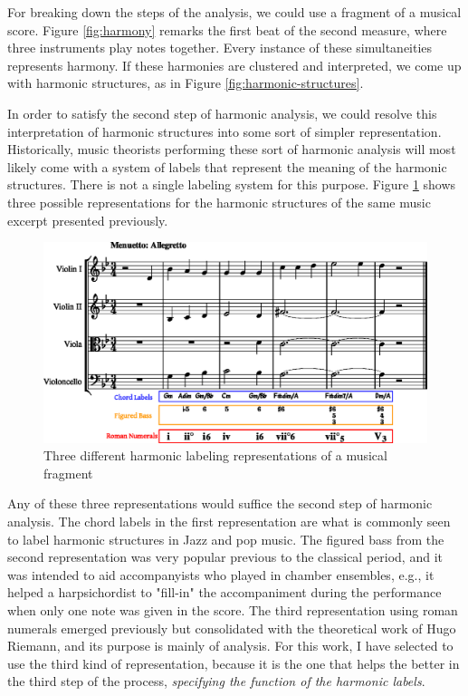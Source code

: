 For breaking down the steps of the analysis, we could use a fragment of a musical score. Figure \ref{fig:harmony} remarks the first beat of the second measure, where three instruments play notes together. Every instance of these simultaneities represents harmony. If these harmonies are clustered and interpreted, we come up with harmonic structures, as in Figure \ref{fig:harmonic-structures}.

In order to satisfy the second step of harmonic analysis, we could resolve this interpretation of harmonic structures into some sort of simpler representation. Historically, music theorists performing these sort of harmonic analysis will most likely come with a system of labels that represent the meaning of the harmonic structures. There is not a single labeling system for this purpose. Figure \ref{fig:harmonic-labels} shows three possible representations for the harmonic structures of the same music excerpt presented previously.

\begin{figure}[h]
  \caption{Three different harmonic labeling representations of a musical fragment}
  \label{fig:harmonic-labels}
  \centering
    \includegraphics[width=1.0\textwidth]{01-introduction/figures/3}
\end{figure}

Any of these three representations would suffice the second step of harmonic analysis. The chord labels in the first representation are what is commonly seen to label harmonic structures in Jazz and pop music. The figured bass from the second representation was very popular previous to the classical period, and it was intended to aid accompanyists who played in chamber ensembles, e.g., it helped a harpsichordist to "fill-in" the accompaniment during the performance when only one note was given in the score. The third representation using roman numerals emerged previously but consolidated with the theoretical work of Hugo Riemann, and its purpose is mainly of analysis. For this work, I have selected to use the third kind of representation, because it is the one that helps the better in the third step of the process, \emph{specifying the function of the harmonic labels}.

